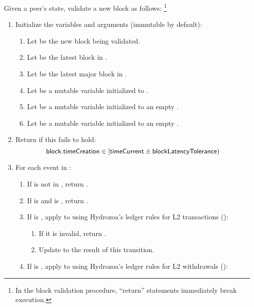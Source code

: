 \documentclass[../hydrozoa.tex]{subfiles}
\begin{document}
Given a peer's state, validate a new block as follows:%
\footnote{In the block validation procedure, ``return'' statements immediately break execution.}
\begin{enumerate}
  \item Initialize the variables and arguments (immutable by default):
    \begin{enumerate}
      \item Let  be the new block being validated.
      \item Let  be the latest block in .
      \item Let  be the latest major block in .
      \item Let  be a mutable variable initialized to .
      \item Let  be a mutable variable initialized to an empty .
      \item Let  be a mutable variable initialized to an empty .
    \end{enumerate}
  \item Return  if this fails to hold:
    \begin{equation*}
      \mathsf{block.timeCreation} \in [\mathsf{timeCurrent} \pm \mathsf{blockLatencyTolerance})
    \end{equation*}
  \item For each event  in :
    \begin{enumerate}
      \item If  is not in , return .
      \item If  is  and  is , return .
      \item If  is , apply  to  using Hydrozoa's ledger rules for L2 transactions ():
        \begin{enumerate}
          \item If it is invalid, return .
          \item Update  to the result of this transition.
        \end{enumerate}
      \item If  is , apply  to  using Hydrozoa's ledger rules for L2 withdrawals ():

\end{enumerate}
\end{enumerate}
\end{document}
